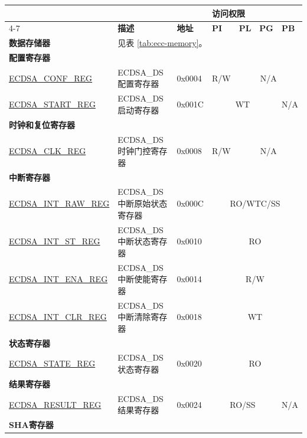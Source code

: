 \begin{longtable}{ | p{4.8cm} | l | p{1.3cm} | l | l | l | l | }
\hline
\rowcolor{lightgray}
 &  &   & \multicolumn{4}{|l|}{\textbf{访问权限}} \\\cline{4-7}
\rowcolor{lightgray}
\multirow{-2}{*}{\textbf{名称}} & \multirow{-2}{*}{\textbf{描述}}  &  \multirow{-2}{*}{\textbf{地址}} & \textbf{PI} & \textbf{PL} & \textbf{PG} & \textbf{PB} \\ \hline
\textbf{数据存储器} & \multicolumn{6}{|l|}{见表 \ref{tab:ecc-memory}。} \\ \hline
\multicolumn{7}{|l|}{\textbf{配置寄存器}} \\ \hline
\hyperref[regdesc:ECDSACONFREG]{ECDSA\_CONF\_REG} & ECDSA\_DS 配置寄存器 & 0x0004 & R/W & \multicolumn{3}{|c|}{N/A} \\ \hline
\hyperref[regdesc:ECDSASTARTREG]{ECDSA\_START\_REG} & ECDSA\_DS 启动寄存器 & 0x001C & \multicolumn{3}{|c|}{WT} & N/A \\ \hline
\multicolumn{7}{|l|}{\textbf{时钟和复位寄存器}} \\ \hline
\hyperref[regdesc:ECDSACLKREG]{ECDSA\_CLK\_REG} & ECDSA\_DS 时钟门控寄存器 & 0x0008 & R/W & \multicolumn{3}{|c|}{N/A} \\ \hline
\multicolumn{7}{|l|}{\textbf{中断寄存器}} \\ \hline
\hyperref[regdesc:ECDSAINTRAWREG]{ECDSA\_INT\_RAW\_REG} & ECDSA\_DS 中断原始状态寄存器 & 0x000C & \multicolumn{4}{|c|}{RO/WTC/SS} \\ \hline
\hyperref[regdesc:ECDSAINTSTREG]{ECDSA\_INT\_ST\_REG} & ECDSA\_DS 中断状态寄存器 & 0x0010 & \multicolumn{4}{|c|}{RO} \\ \hline
\hyperref[regdesc:ECDSAINTENAREG]{ECDSA\_INT\_ENA\_REG} & ECDSA\_DS 中断使能寄存器 & 0x0014 & \multicolumn{4}{|c|}{R/W} \\ \hline
\hyperref[regdesc:ECDSAINTCLRREG]{ECDSA\_INT\_CLR\_REG} & ECDSA\_DS 中断清除寄存器 & 0x0018 & \multicolumn{4}{|c|}{WT} \\ \hline
\multicolumn{7}{|l|}{\textbf{状态寄存器}} \\ \hline
\hyperref[regdesc:ECDSASTATEREG]{ECDSA\_STATE\_REG} & ECDSA\_DS 状态寄存器 & 0x0020 & \multicolumn{4}{|c|}{RO} \\ \hline
\multicolumn{7}{|l|}{\textbf{结果寄存器}} \\ \hline
\hyperref[regdesc:ECDSARESULTREG]{ECDSA\_RESULT\_REG} & ECDSA\_DS 结果寄存器 & 0x0024 & \multicolumn{3}{|c|}{RO/SS} & N/A \\ \hline
\multicolumn{7}{|l|}{\textbf{SHA寄存器}} \\ \hline

\end{longtable}
